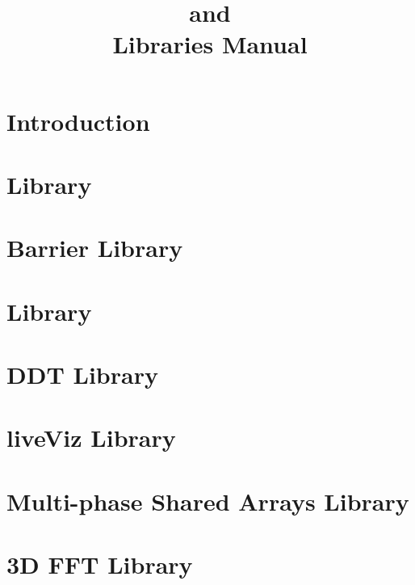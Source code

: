 \documentclass[10pt]{report}
\title{\converse{} and \charmpp{}\\ Libraries Manual}
\begin{document}
\maketitle

\chapter{Introduction}

\chapter{\irecv{} Library}

\chapter{Barrier Library}

\chapter{\tempo{} Library}

\chapter{DDT Library}

\chapter{liveViz Library}

\chapter{Multi-phase Shared Arrays Library}

\chapter{3D FFT Library}



\end{document}
